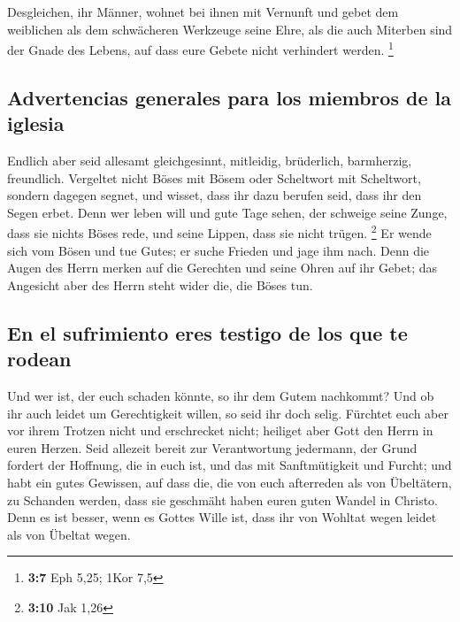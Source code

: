  Desgleichen, ihr Männer, wohnet bei ihnen mit Vernunft
und gebet dem weiblichen als dem schwächeren Werkzeuge seine Ehre, als
die auch Miterben sind der Gnade des Lebens, auf dass eure Gebete nicht
verhindert werden. \footnote{\textbf{3:7} Eph 5,25; 1Kor 7,5}

\hypertarget{advertencias-generales-para-los-miembros-de-la-iglesia}{%
\subsection{Advertencias generales para los miembros de la
iglesia}\label{advertencias-generales-para-los-miembros-de-la-iglesia}}

 Endlich aber seid allesamt gleichgesinnt, mitleidig,
brüderlich, barmherzig, freundlich.  Vergeltet nicht Böses
mit Bösem oder Scheltwort mit Scheltwort, sondern dagegen segnet, und
wisset, dass ihr dazu berufen seid, dass ihr den Segen erbet.
 Denn wer leben will und gute Tage sehen, der schweige
seine Zunge, dass sie nichts Böses rede, und seine Lippen, dass sie
nicht trügen. \footnote{\textbf{3:10} Jak 1,26}  Er wende
sich vom Bösen und tue Gutes; er suche Frieden und jage ihm nach.
 Denn die Augen des Herrn merken auf die Gerechten und
seine Ohren auf ihr Gebet; das Angesicht aber des Herrn steht wider die,
die Böses tun.

\hypertarget{en-el-sufrimiento-eres-testigo-de-los-que-te-rodean}{%
\subsection{En el sufrimiento eres testigo de los que te
rodean}\label{en-el-sufrimiento-eres-testigo-de-los-que-te-rodean}}

 Und wer ist, der euch schaden könnte, so ihr dem Gutem
nachkommt?  Und ob ihr auch leidet um Gerechtigkeit
willen, so seid ihr doch selig. Fürchtet euch aber vor ihrem Trotzen
nicht und erschrecket nicht;  heiliget aber Gott den
Herrn in euren Herzen. Seid allezeit bereit zur Verantwortung jedermann,
der Grund fordert der Hoffnung, die in euch ist,  und das
mit Sanftmütigkeit und Furcht; und habt ein gutes Gewissen, auf dass
die, die von euch afterreden als von Übeltätern, zu Schanden werden,
dass sie geschmäht haben euren guten Wandel in Christo. 
Denn es ist besser, wenn es Gottes Wille ist, dass ihr von Wohltat wegen
leidet als von Übeltat wegen.

